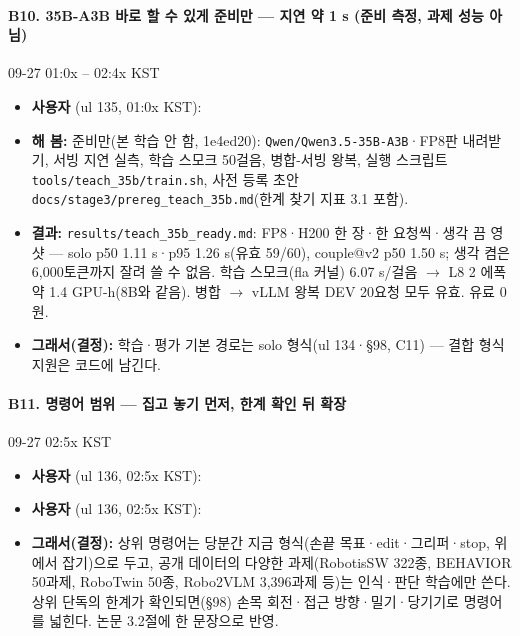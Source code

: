 \paragraph{B10. 35B-A3B 바로 할 수 있게 준비만 --- 지연 약 1 s (준비 측정, 과제 성능 아님)}
{\small 09-27 01:0x -- 02:4x KST}
\begin{itemize}
  \item \textbf{사용자} (ul 135, 01:0x KST): 
  \item \textbf{해 봄:} 준비만(본 학습 안 함, 1e4ed20): \texttt{Qwen/\allowbreak{}Qwen3.\allowbreak{}5-\allowbreak{}35B-\allowbreak{}A3B}·FP8판 내려받기, 서빙 지연 실측, 학습 스모크 50걸음, 병합-서빙 왕복, 실행 스크립트 \texttt{tools/\allowbreak{}teach\_\allowbreak{}35b/\allowbreak{}train.\allowbreak{}sh}, 사전 등록 초안 \texttt{docs/\allowbreak{}stage3/\allowbreak{}prereg\_\allowbreak{}teach\_\allowbreak{}35b.\allowbreak{}md}(한계 찾기 지표 3.1 포함).
  \item \textbf{결과:} \texttt{results/\allowbreak{}teach\_\allowbreak{}35b\_\allowbreak{}ready.\allowbreak{}md}: FP8·H200 한 장·한 요청씩·생각 끔 영샷 --- solo p50 1.11 s·p95 1.26 s(유효 59/60), couple@v2 p50 1.50 s; 생각 켬은 6,000토큰까지 잘려 쓸 수 없음. 학습 스모크(fla 커널) 6.07 s/걸음 $\rightarrow$ L8 2 에폭 약 1.4 GPU-h(8B와 같음). 병합 $\rightarrow$ vLLM 왕복 DEV 20요청 모두 유효. 유료 0원.
  \item \textbf{그래서(결정):} 학습·평가 기본 경로는 solo 형식(ul 134·§98, C11) --- 결합 형식 지원은 코드에 남긴다.
\end{itemize}

\paragraph{B11. 명령어 범위 --- 집고 놓기 먼저, 한계 확인 뒤 확장}
{\small 09-27 02:5x KST}
\begin{itemize}
  \item \textbf{사용자} (ul 136, 02:5x KST): 
  \item \textbf{사용자} (ul 136, 02:5x KST): 
  \item \textbf{그래서(결정):} 상위 명령어는 당분간 지금 형식(손끝 목표·edit·그리퍼·stop, 위에서 잡기)으로 두고, 공개 데이터의 다양한 과제(RobotisSW 322종, BEHAVIOR 50과제, RoboTwin 50종, Robo2VLM 3,396과제 등)는 인식·판단 학습에만 쓴다. 상위 단독의 한계가 확인되면(§98) 손목 회전·접근 방향·밀기·당기기로 명령어를 넓힌다. 논문 3.2절에 한 문장으로 반영.
\end{itemize}

